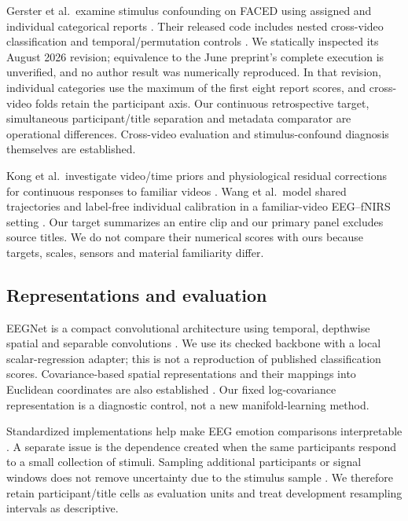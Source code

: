\documentclass[conference]{IEEEtran}
\begin{document}
Gerster et al.\ examine stimulus confounding on FACED using assigned and individual categorical reports \cite{gerster2026stimulus}. Their released code includes nested cross-video classification and temporal/permutation controls \cite{gerster2026code}. We statically inspected its August 2026 revision; equivalence to the June preprint's complete execution is unverified, and no author result was numerically reproduced. In that revision, individual categories use the maximum of the first eight report scores, and cross-video folds retain the participant axis. Our continuous retrospective target, simultaneous participant/title separation and metadata comparator are operational differences. Cross-video evaluation and stimulus-confound diagnosis themselves are established.

Kong et al.\ investigate video/time priors and physiological residual corrections for continuous responses to familiar videos \cite{kong2026priors}. Wang et al.\ model shared trajectories and label-free individual calibration in a familiar-video EEG--fNIRS setting \cite{wang2026shared}. Our target summarizes an entire clip and our primary panel excludes source titles. We do not compare their numerical scores with ours because targets, scales, sensors and material familiarity differ.

\subsection{Representations and evaluation}
EEGNet is a compact convolutional architecture using temporal, depthwise spatial and separable convolutions \cite{lawhern2018eegnet}. We use its checked backbone with a local scalar-regression adapter; this is not a reproduction of published classification scores. Covariance-based spatial representations and their mappings into Euclidean coordinates are also established \cite{zhang2023spatiotemporal}. Our fixed log-covariance representation is a diagnostic control, not a new manifold-learning method.

Standardized implementations help make EEG emotion comparisons interpretable \cite{liu2025libeer}. A separate issue is the dependence created when the same participants respond to a small collection of stimuli. Sampling additional participants or signal windows does not remove uncertainty due to the stimulus sample \cite{westfall2014power}. We therefore retain participant/title cells as evaluation units and treat development resampling intervals as descriptive.
\end{document}

